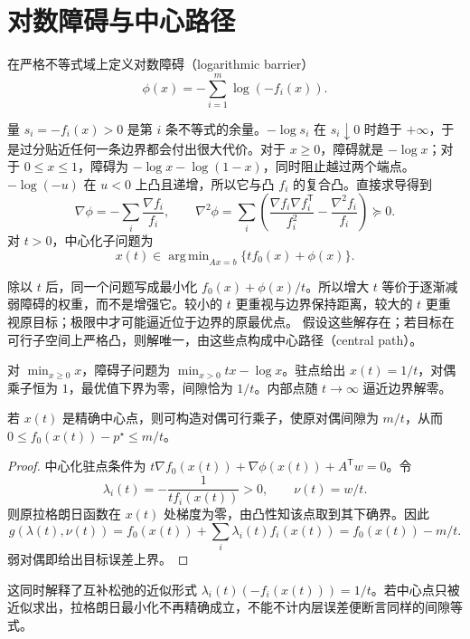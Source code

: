 \documentclass[UTF8,12pt,a4paper,fontset=fandol]{ctexbook}
\begin{document}
\section{对数障碍与中心路径}

在严格不等式域上定义对数障碍（logarithmic barrier）
\[
 \phi(x)=-\sum_{i=1}^m\log(-f_i(x)).
\]

量 $s_i=-f_i(x)>0$ 是第 $i$ 条不等式的余量。$-\log s_i$ 在 $s_i\downarrow0$ 时趋于 $+\infty$，于是过分贴近任何一条边界都会付出很大代价。对于 $x\geq0$，障碍就是 $-\log x$；对于 $0\leq x\leq1$，障碍为 $-\log x-\log(1-x)$，同时阻止越过两个端点。
$-\log(-u)$ 在 $u<0$ 上凸且递增，所以它与凸 $f_i$ 的复合凸。直接求导得到
\[
 \nabla\phi=-\sum_i\frac{\nabla f_i}{f_i},\qquad
 \nabla^2\phi=\sum_i\left(\frac{\nabla f_i\nabla f_i^{\mathsf T}}{f_i^2}
                         -\frac{\nabla^2f_i}{f_i}\right)\succeq0.
\]
对 $t>0$，中心化子问题为
\begin{equation}
 x(t)\in\mathop{\mathrm{arg\,min}}_{Ax=b}\{t f_0(x)+\phi(x)\}.
 \label{eq:co-central-path}
\end{equation}

除以 $t$ 后，同一个问题写成最小化 $f_0(x)+\phi(x)/t$。所以增大 $t$ 等价于逐渐减弱障碍的权重，而不是增强它。较小的 $t$ 更重视与边界保持距离，较大的 $t$ 更重视原目标；极限中才可能逼近位于边界的原最优点。
假设这些解存在；若目标在可行子空间上严格凸，则解唯一，由这些点构成中心路径（central path）。

\begin{example}[一维中心路径]
对 $\min_{x\geq0}x$，障碍子问题为 $\min_{x>0}tx-\log x$。驻点给出 $x(t)=1/t$，对偶乘子恒为 $1$，最优值下界为零，间隙恰为 $1/t$。内部点随 $t\to\infty$ 逼近边界解零。
\end{example}

\begin{theorem}[精确中心点的误差界]
若 $x(t)$ 是精确中心点，则可构造对偶可行乘子，使原对偶间隙为 $m/t$，从而 $0\leq f_0(x(t))-p^\star\leq m/t$。
\end{theorem}
\begin{proof}
中心化驻点条件为 $t\nabla f_0(x(t))+\nabla\phi(x(t))+A^{\mathsf T}w=0$。令
\[
 \lambda_i(t)=-\frac1{t f_i(x(t))}>0,\qquad\nu(t)=w/t.
\]
则原拉格朗日函数在 $x(t)$ 处梯度为零，由凸性知该点取到其下确界。因此
\[
 g(\lambda(t),\nu(t))=f_0(x(t))+\sum_i\lambda_i(t)f_i(x(t))
 =f_0(x(t))-m/t.
\]
弱对偶即给出目标误差上界。
\end{proof}
这同时解释了互补松弛的近似形式 $\lambda_i(t)(-f_i(x(t)))=1/t$。若中心点只被近似求出，拉格朗日最小化不再精确成立，不能不计内层误差便断言同样的间隙等式。
\end{document}
